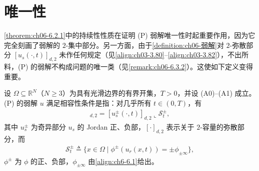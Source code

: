 \documentclass[../../main.tex]{subfiles}%
\begin{document}
\section{唯一性}\label{section:ch06-唯一性}

\cref{theorem:ch06-6.2.1}中的持续性性质在证明 (P) 弱解唯一性时起重要作用，因为它完全刻画了弱解的 $2$-集中部分。另一方面，由于\cref{definition:ch06-弱解}对 $2$-弥散部分 $[u_s(\cdot,t)]_{d,2}$ 未作任何规定（见\eqref{align:ch03-3.80}--\eqref{align:ch03-3.82}），不出所料，(P) 的弱解不构成问题的唯一类（见\cref{remark:ch06-6.3.2}）。这使如下定义变得重要。
\begin{definition}\label{definition:ch06-相容性条件}
设 $\Omega\subseteq\mathbb{R}^N$（$N\geqslant3$）为具有光滑边界的有界开集，$T>0$，并设 (A0)--(A1) 成立。(P) 的弱解 $u$ 满足相容性条件是指：对几乎所有 $t\in(0,T)$，有
\begin{align}
[u^\pm_s(\cdot,t)]_{d,2}=[u^\pm_s(\cdot,t)]_{d,2}\llcorner\mathscr{S}^\pm_t, \label{align:ch6-6.21a}
\end{align}
其中 $u^\pm_s$ 为奇异部分 $u_s$ 的 Jordan 正、负部，$[\cdot]_{d,2}$ 表示关于 $2$-容量的弥散部分，而
\begin{align}
\mathscr{S}^\pm_t\triangleq \{x\in\Omega\mid\phi^\pm(u_r(x,t))=\pm\phi_{\pm\infty}\}, \label{align:ch6-6.21b}
\end{align}
$\phi^\pm$ 为 $\phi$ 的正、负部，$\phi_{\pm\infty}$ 由\eqref{align:ch6-6.1}给出。
\end{definition}
\end{document}
